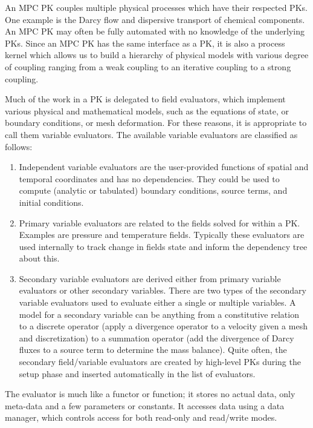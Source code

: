 An MPC PK couples multiple physical processes which have their respected PKs.
One example is the Darcy flow and dispersive transport of chemical components.
An MPC PK may often be fully automated with no knowledge of the underlying PKs.
Since an MPC PK has the same interface as a PK, it is also a process kernel which
allows us to build a hierarchy of physical models with various degree of coupling
ranging from a weak coupling to an iterative coupling to a strong coupling.


Much of the work in a PK is delegated to field evaluators, which implement various 
physical and mathematical models, such as the equations of state, or boundary conditions, 
or mesh deformation. 
For these reasons, it is appropriate to call them variable evaluators.
The available variable evaluators are classified as follows:

\begin{enumerate}
\item Independent variable evaluators are the user-provided functions of spatial and temporal coordinates
      and has no dependencies.
      They could be used to compute (analytic or tabulated) boundary conditions, source terms, and initial conditions. 
\item Primary variable evaluators are related to the fields solved for within a PK.
      Examples are pressure and temperature fields.
      Typically these evaluators are used internally to track change in fields state and inform the 
      dependency tree about this.
\item Secondary variable evaluators are derived either from primary variable evaluators or other secondary variables. 
      There are two types of the secondary variable evaluators used to evaluate either a single or multiple variables.
      A model for a secondary variable can be anything from a constitutive relation to a discrete operator
      (apply a divergence operator to a velocity given a mesh and discretization) 
      to a summation operator (add the divergence of Darcy fluxes to a source term to determine the mass balance).
      Quite often, the secondary field/variable evaluators are created by high-level PKs during the setup phase 
      and inserted automatically in the list of evaluators. 
\end{enumerate}

The evaluator is much like a functor or function; it stores no actual data, only meta-data and 
a few parameters or constants.
It accesses data using a data manager, which controls access for both read-only and read/write modes. 

